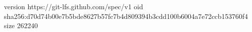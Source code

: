 version https://git-lfs.github.com/spec/v1
oid sha256:d70d74b00e7b5bde8627b57fc7b4d809394b3cdd100b6004a7e72ccb153760f4
size 262240
